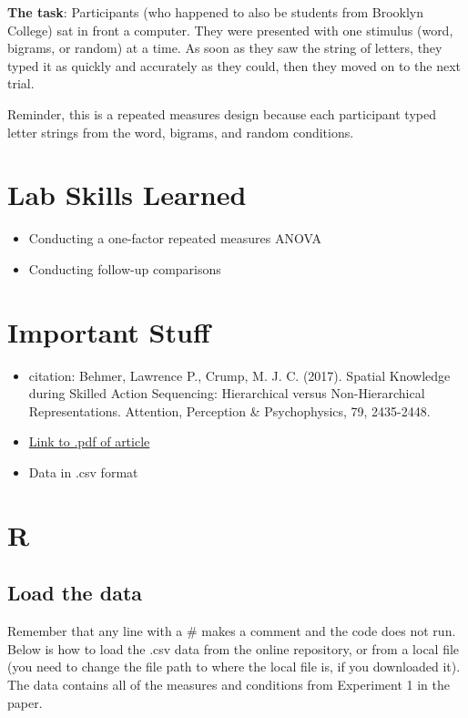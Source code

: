 \documentclass[]{book}
\providecommand{\tightlist}{%
  \setlength{\itemsep}{0pt}\setlength{\parskip}{0pt}}
\begin{document}
\textbf{The task}: Participants (who happened to also be students from
Brooklyn College) sat in front a computer. They were presented with one
stimulus (word, bigrams, or random) at a time. As soon as they saw the
string of letters, they typed it as quickly and accurately as they
could, then they moved on to the next trial.

Reminder, this is a repeated measures design because each participant
typed letter strings from the word, bigrams, and random conditions.

\section{Lab Skills Learned}\label{lab-skills-learned-3}

\begin{itemize}
\tightlist
\item
  Conducting a one-factor repeated measures ANOVA
\item
  Conducting follow-up comparisons
\end{itemize}

\section{Important Stuff}\label{important-stuff-3}

\begin{itemize}
\tightlist
\item
  citation: Behmer, Lawrence P., Crump, M. J. C. (2017). Spatial
  Knowledge during Skilled Action Sequencing: Hierarchical versus
  Non-Hierarchical Representations. Attention, Perception \&
  Psychophysics, 79, 2435-2448.
\item
  \href{https://github.com/CrumpLab/CrumpLab.github.io/raw/master/files/8753/Behmer\%20and\%20Crump\%20-\%202017.pdf}{Link
  to .pdf of article}
\item
  Data in .csv format
\end{itemize}

\section{R}\label{r-9}

\subsection{Load the data}\label{load-the-data-3}

Remember that any line with a \# makes a comment and the code does not
run. Below is how to load the .csv data from the online repository, or
from a local file (you need to change the file path to where the local
file is, if you downloaded it). The data contains all of the measures
and conditions from Experiment 1 in the paper.
\end{document}
